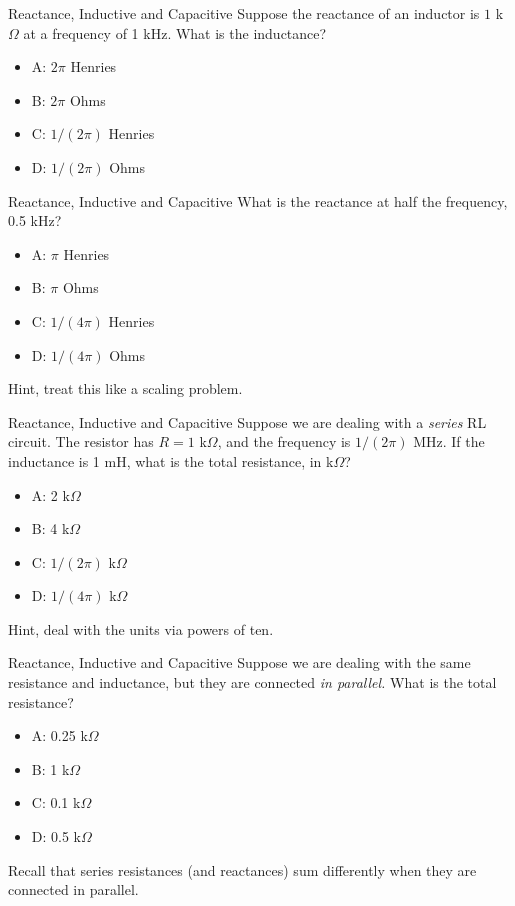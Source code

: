 \documentclass{beamer}
\begin{document}
\begin{frame}{Reactance, Inductive and Capacitive}
Suppose the reactance of an inductor is $1$ k$\Omega$ at a frequency of 1 kHz.  What is the inductance?
\begin{itemize}
\item A: $2\pi$ Henries
\item B: $2\pi$ Ohms
\item C: $1/(2\pi)$ Henries
\item D: $1/(2\pi)$ Ohms
\end{itemize}
\end{frame}

\begin{frame}{Reactance, Inductive and Capacitive}
What is the reactance at half the frequency, 0.5 kHz?
\begin{itemize}
\item A: $\pi$ Henries
\item B: $\pi$ Ohms
\item C: $1/(4\pi)$ Henries
\item D: $1/(4\pi)$ Ohms
\end{itemize}
\footnotesize
Hint, treat this like a scaling problem.
\end{frame}

\begin{frame}{Reactance, Inductive and Capacitive}
Suppose we are dealing with a \textit{series} RL circuit.  The resistor has $R = 1$ k$\Omega$, and the frequency is $1/(2\pi)$ MHz.  If the inductance is 1 mH, what is the total resistance, in k$\Omega$?
\begin{itemize}
\item A: 2 k$\Omega$
\item B: 4 k$\Omega$
\item C: $1/(2\pi)$ k$\Omega$
\item D: $1/(4\pi)$ k$\Omega$
\end{itemize}
\footnotesize
Hint, deal with the units via powers of ten.
\end{frame}

\begin{frame}{Reactance, Inductive and Capacitive}
Suppose we are dealing with the same resistance and inductance, but they are connected \textit{in parallel.}  What is the total resistance?
\begin{itemize}
\item A: 0.25 k$\Omega$
\item B: 1 k$\Omega$
\item C: 0.1 k$\Omega$
\item D: 0.5 k$\Omega$
\end{itemize}
\footnotesize
Recall that series resistances (and reactances) sum differently when they are connected in parallel.
\end{frame}
\end{document}
